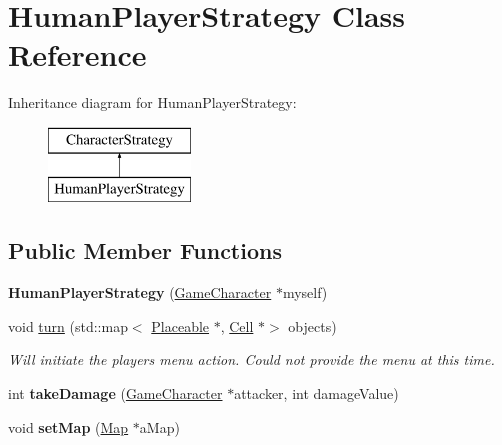 \hypertarget{class_human_player_strategy}{}\section{Human\+Player\+Strategy Class Reference}
\label{class_human_player_strategy}
Inheritance diagram for Human\+Player\+Strategy\+:\begin{figure}[H]
\begin{center}
\leavevmode
\includegraphics[height=2.000000cm]{class_human_player_strategy}
\end{center}
\end{figure}
\subsection*{Public Member Functions}
\begin{DoxyCompactItemize}
\item 
\hypertarget{class_human_player_strategy_ac65a89c182b793d0f1349bc2781f2c87}{}\label{class_human_player_strategy_ac65a89c182b793d0f1349bc2781f2c87} 
{\bfseries Human\+Player\+Strategy} (\hyperlink{class_game_character}{Game\+Character} $\ast$myself)
\item 
\hypertarget{class_human_player_strategy_a0f83d38f051a8eb5c6ae3946ae93844d}{}\label{class_human_player_strategy_a0f83d38f051a8eb5c6ae3946ae93844d} 
void \hyperlink{class_human_player_strategy_a0f83d38f051a8eb5c6ae3946ae93844d}{turn} (std\+::map$<$ \hyperlink{class_placeable}{Placeable} $\ast$, \hyperlink{class_cell}{Cell} $\ast$$>$ objects)
\begin{DoxyCompactList}\small\item\em Will initiate the players menu action. Could not provide the menu at this time. \end{DoxyCompactList}\item 
\hypertarget{class_human_player_strategy_a79253f41f4f50481fd57052dc31c11db}{}\label{class_human_player_strategy_a79253f41f4f50481fd57052dc31c11db} 
int {\bfseries take\+Damage} (\hyperlink{class_game_character}{Game\+Character} $\ast$attacker, int damage\+Value)
\item 
\hypertarget{class_human_player_strategy_a92ec7020611275c7eeb7db15bf6eb548}{}\label{class_human_player_strategy_a92ec7020611275c7eeb7db15bf6eb548} 
void {\bfseries set\+Map} (\hyperlink{class_map}{Map} $\ast$a\+Map)
\end{DoxyCompactItemize}
